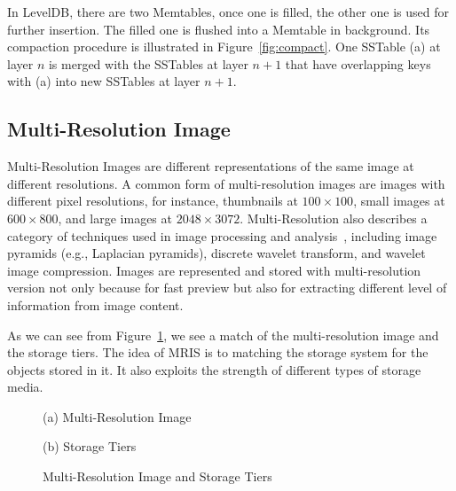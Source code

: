 In LevelDB, there are two Memtables, once one is filled, the other one
is used for further insertion. The filled one is flushed into a
Memtable in background. Its compaction procedure is illustrated in
Figure~\ref{fig:compact}. One SSTable (a) at layer $n$ is merged with
the SSTables at layer $n+1$ that have overlapping keys with (a) into
new SSTables at layer $n+1$.

\subsection{Multi-Resolution Image}
Multi-Resolution Images are different representations of the same
image at different resolutions. A common form of multi-resolution
images are images with different pixel resolutions, for instance,
thumbnails at $100\times100$, small images at $600\times800$, and
large images at $2048\times3072$. Multi-Resolution also describes a
category of techniques used in image processing and
analysis~\cite{mrisimg}, including image pyramids (e.g., Laplacian
pyramids), discrete wavelet transform, and wavelet image compression.
Images are represented and stored with multi-resolution version not
only because for fast preview but also for extracting different level
of information from image content.

As we can see from Figure~\ref{fig:mrisidea}, we see a match of the
multi-resolution image and the storage tiers. The idea of MRIS is to
matching the storage system for the objects stored in it. It also
exploits the strength of different types of storage media.

\begin{figure}[t]
  \centering
  \begin{minipage}[l]{0.48\linewidth}
    \centerline{\footnotesize(a) Multi-Resolution Image}\medskip
  \end{minipage}
  \begin{minipage}[r]{0.48\linewidth}
    \centerline{\footnotesize(b) Storage Tiers}\medskip
  \end{minipage}
  \caption{Multi-Resolution Image and Storage Tiers}
  \label{fig:mrisidea}
\end{figure}




